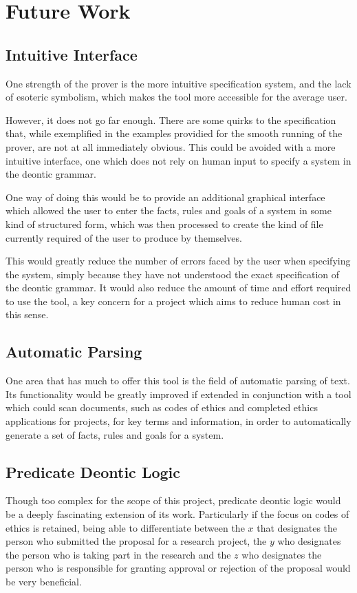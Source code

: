 \documentclass{l4proj}
\begin{document}
\section{Future Work}

\subsection{Intuitive Interface}
One strength of the prover is the more intuitive specification system, and the lack of esoteric symbolism, which makes the tool more accessible for the average user. 

However, it does not go far enough. There are some quirks to the specification that, while exemplified in the examples providied for the smooth running of the prover, are not at all immediately obvious. This could be avoided with a more intuitive interface, one which does not rely on human input to specify a system in the deontic grammar. 

One way of doing this would be to provide an additional graphical interface which allowed the user to enter the facts, rules and goals of a system in some kind of structured form, which was then processed to create the kind of file currently required of the user to produce by themselves. 

This would greatly reduce the number of errors faced by the user when specifying the system, simply because they have not understood the exact specification of the deontic grammar. It would also reduce the amount of time and effort required to use the tool, a key concern for a project which aims to reduce human cost in this sense. 

\subsection{Automatic Parsing}
One area that has much to offer this tool is the field of automatic parsing of text. Its functionality would be greatly improved if extended in conjunction with a tool which could scan documents, such as codes of ethics and completed ethics applications for projects, for key terms and information, in order to automatically generate a set of facts, rules and goals for a system. 

\subsection{Predicate Deontic Logic}
Though too complex for the scope of this project, predicate deontic logic would be a deeply fascinating extension of its work. Particularly if the focus on codes of ethics is retained, being able to differentiate between the $x$ that designates the person who submitted the proposal for a research project, the $y$ who designates the person who is taking part in the research and the $z$ who designates the person who is responsible for granting approval or rejection of the proposal would be very beneficial. 
\end{document}
